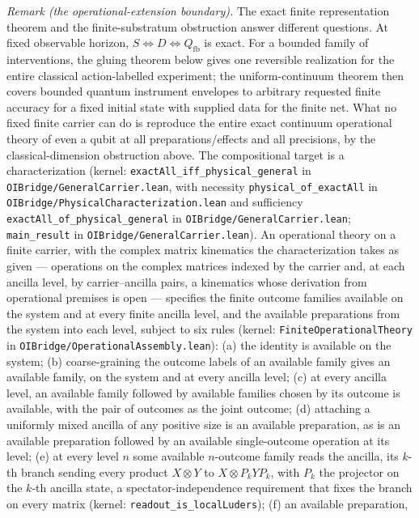 \documentclass[
]{article}
\begin{document}
\emph{Remark (the operational-extension boundary).} The exact finite
representation theorem and the finite-substratum obstruction answer
different questions. At fixed observable horizon,
\(S\iff D\iff Q_{\mathrm{fb}}\) is exact. For a bounded family of
interventions, the gluing theorem below gives one reversible realization
for the entire classical action-labelled experiment; the
uniform-continuum theorem then covers bounded quantum instrument
envelopes to arbitrary requested finite accuracy for a fixed initial
state with supplied data for the finite net. What no fixed finite
carrier can do is reproduce the entire exact continuum operational
theory of even a qubit at all preparations/effects and all precisions,
by the classical-dimension obstruction above. The compositional target
is a characterization (kernel: \texttt{exactAll\_iff\_physical\_general}
in \texttt{OIBridge/GeneralCarrier.lean}, with necessity
\texttt{physical\_of\_exactAll} in
\texttt{OIBridge/PhysicalCharacterization.lean} and sufficiency
\texttt{exactAll\_of\_physical\_general} in
\texttt{OIBridge/GeneralCarrier.lean}; \texttt{main\_result} in
\texttt{OIBridge/GeneralCarrier.lean}). An operational theory on a
finite carrier, with the complex matrix kinematics the characterization
takes as given --- operations on the complex matrices indexed by the
carrier and, at each ancilla level, by carrier--ancilla pairs, a
kinematics whose derivation from operational premises is open ---
specifies the finite outcome families available on the system and at
every finite ancilla level, and the available preparations from the
system into each level, subject to six rules (kernel:
\texttt{FiniteOperationalTheory} in
\texttt{OIBridge/OperationalAssembly.lean}): (a) the identity is
available on the system; (b) coarse-graining the outcome labels of an
available family gives an available family, on the system and at every
ancilla level; (c) at every ancilla level, an available family followed
by available families chosen by its outcome is available, with the pair
of outcomes as the joint outcome; (d) attaching a uniformly mixed
ancilla of any positive size is an available preparation, as is an
available preparation followed by an available single-outcome operation
at its level; (e) at every level \(n\) some available \(n\)-outcome
family reads the ancilla, its \(k\)-th branch sending every product
\(X \otimes Y\) to \(X \otimes P_k Y P_k\), with \(P_k\) the projector
on the \(k\)-th ancilla state, a spectator-independence requirement that
fixes the branch on every matrix (kernel:
\texttt{readout\_is\_localLuders}); (f) an available preparation,
\end{document}
